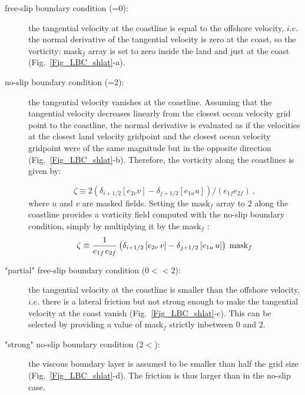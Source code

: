 \begin{description}

\item[free-slip boundary condition (=0): ]  the tangential velocity at the 
coastline is equal to the offshore velocity, $i.e.$ the normal derivative of the 
tangential velocity is zero at the coast, so the vorticity: mask$_{f}$ array is set 
to zero inside the land and just at the coast (Fig.~\ref{Fig_LBC_shlat}-a).

\item[no-slip boundary condition (=2): ] the tangential velocity vanishes 
at the coastline. Assuming that the tangential velocity decreases linearly from 
the closest ocean velocity grid point to the coastline, the normal derivative is 
evaluated as if the velocities at the closest land velocity gridpoint and the closest 
ocean velocity gridpoint were of the same magnitude but in the opposite direction 
(Fig.~\ref{Fig_LBC_shlat}-b). Therefore, the vorticity along the coastlines is given by: 

\begin{equation*}
\zeta \equiv 2 \left(\delta_{i+1/2} \left[e_{2v} v \right] - \delta_{j+1/2} \left[e_{1u} u \right] \right) / \left(e_{1f} e_{2f} \right) \ ,
\end{equation*}
where $u$ and $v$ are masked fields. Setting the mask$_{f}$ array to $2$ along 
the coastline provides a vorticity field computed with the no-slip boundary condition, 
simply by multiplying it by the mask$_{f}$ :
\begin{equation} \label{Eq_lbc_bbbb}
\zeta \equiv \frac{1}{e_{1f} {\kern 1pt}e_{2f} }\left( {\delta _{i+1/2} 
\left[ {e_{2v} \,v} \right]-\delta _{j+1/2} \left[ {e_{1u} \,u} \right]} 
\right)\;\mbox{mask}_f 
\end{equation}

\item["partial" free-slip boundary condition (0$<$$<$2): ] the tangential 
velocity at the coastline is smaller than the offshore velocity, $i.e.$ there is a lateral 
friction but not strong enough to make the tangential velocity at the coast vanish 
(Fig.~\ref{Fig_LBC_shlat}-c). This can be selected by providing a value of mask$_{f}$ 
strictly inbetween $0$ and $2$.

\item["strong" no-slip boundary condition (2$<$): ] the viscous boundary 
layer is assumed to be smaller than half the grid size (Fig.~\ref{Fig_LBC_shlat}-d). 
The friction is thus larger than in the no-slip case.

\end{description}

